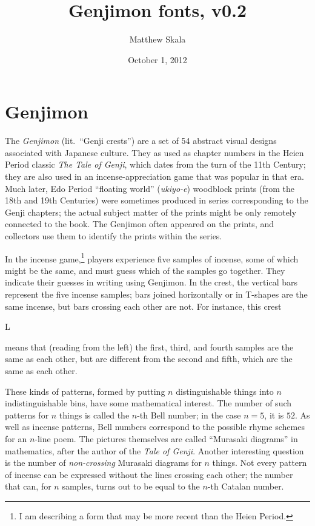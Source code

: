 \documentclass[12pt]{article}
\title{Genjimon fonts, v0.2}
\author{Matthew Skala}
\date{October 1, 2012}
\newcommand\genji[1]{{\genjiface #1}}
\begin{document}

\maketitle

\section{Genjimon}

The \textit{Genjimon} (lit.~``Genji crests'') are a set of 54 abstract
visual designs associated with Japanese culture.  They as used as chapter
numbers in the Heien Period classic \textit{The Tale of Genji}, which dates
from the turn of the 11th Century; they are also used in an
incense-appreciation game that was popular in that era.  Much later, Edo
Period ``floating world'' (\textit{ukiyo-e}) woodblock prints (from the 18th
and 19th Centuries) were sometimes produced in series corresponding to the
Genji chapters; the actual subject matter of the prints might be only
remotely connected to the book.  The Genjimon often appeared on the prints,
and collectors use them to identify the prints within the series.

In the incense game,\footnote{I am describing a form that may be more recent
than the Heien Period.} players experience five samples of incense, some
of which might be the same, and must guess which of the samples go together.
They indicate their guesses in writing using
Genjimon.  In the crest, the vertical bars represent the five incense
samples; bars joined horizontally or in \textsf{T}-shapes are the same
incense, but bars crossing each other are not.  For instance, this crest
\begin{center}
  \Huge\genji{L}
\end{center}
means that (reading from the left) the first, third, and fourth samples are
the same as each other, but are different from the second and fifth, which are
the same as each other.

These kinds of patterns, formed by putting $n$ distinguishable things into
$n$ indistinguishable bins, have some mathematical interest.  The number of
such patterns for $n$ things is called the $n$-th Bell number; in the case
$n=5$, it is $52$. As well as incense patterns, Bell numbers correspond to
the possible rhyme schemes for an $n$-line poem.  The pictures themselves
are called ``Murasaki diagrams'' in mathematics, after the author of the
\textit{Tale of Genji}.  Another interesting question is the number of
\emph{non-crossing} Murasaki diagrams for $n$ things.  Not every pattern of
incense can be expressed without the lines crossing each other; the number
that can, for $n$ samples, turns out to be equal to the $n$-th Catalan
number.
\end{document}
